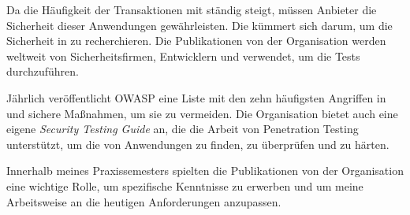 Da die Häufigkeit der Transaktionen mit  ständig steigt, müssen Anbieter die Sicherheit dieser Anwendungen gewährleisten. Die  kümmert sich darum, um die Sicherheit in  zu recherchieren. Die Publikationen von der Organisation werden weltweit von Sicherheitsfirmen, Entwicklern und  verwendet, um die Tests durchzuführen. 

Jährlich veröffentlicht \gls{OWASP} eine Liste mit den zehn häufigsten Angriffen in  und sichere Maßnahmen, um sie zu vermeiden. Die Organisation bietet auch eine eigene \textit{Security Testing Guide} an, die die Arbeit von Penetration Testing unterstützt, um die  von Anwendungen zu finden, zu überprüfen und zu härten.

Innerhalb meines Praxissemesters spielten die Publikationen von der Organisation eine wichtige Rolle, um spezifische Kenntnisse zu erwerben und um meine Arbeitsweise an die heutigen Anforderungen anzupassen. 